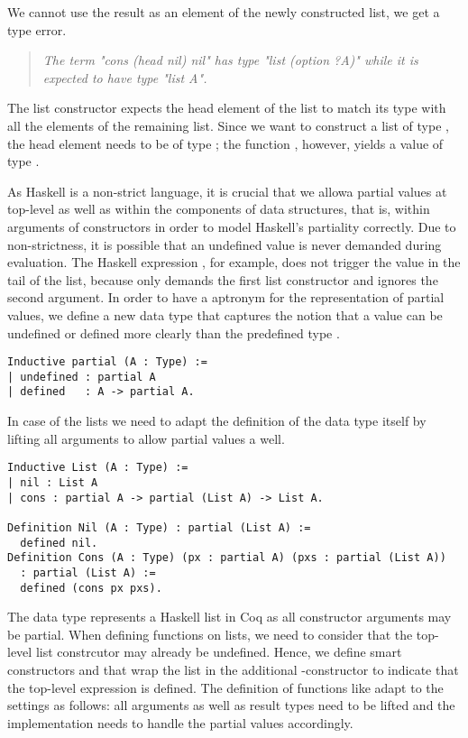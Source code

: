 We cannot use the result as an element of the newly constructed list, we get a type error.

\begin{quote}
\emph{The term "cons (head nil) nil" has type "list (option ?A)" while it is expected to have type "list A".}
\end{quote}

The list constructor  expects the head element of the list to match its type with all the elements of the remaining list.
Since we want to construct a list of type , the head element needs to be of type ; the function , however, yields a value of type .

As Haskell is a non-strict language, it is crucial that we allowa partial values at top-level as well as within the components of data structures, that is, within arguments of constructors in order to model Haskell's partiality correctly.
Due to non-strictness, it is possible that an undefined value is never demanded during evaluation.
The Haskell expression , for example, does not trigger the  value in the tail of the list, because  only demands the first list constructor and ignores the second argument.
In order to have a aptronym for the representation of partial values, we define a new data type  that captures the notion that a value can be undefined or defined more clearly than the predefined type .

\begin{verbatim}
Inductive partial (A : Type) :=
| undefined : partial A
| defined   : A -> partial A.
\end{verbatim}

In case of the lists we need to adapt the definition of the data type itself by lifting all arguments to allow partial values a well.

\begin{verbatim}
Inductive List (A : Type) :=
| nil : List A
| cons : partial A -> partial (List A) -> List A.

Definition Nil (A : Type) : partial (List A) :=
  defined nil.
Definition Cons (A : Type) (px : partial A) (pxs : partial (List A)) 
  : partial (List A) :=
  defined (cons px pxs).
\end{verbatim}

The data type  represents a Haskell list in Coq as all constructor arguments may be partial.
When defining functions on lists, we need to consider that the top-level list constrcutor may already be undefined.
Hence, we define smart constructors  and  that wrap the list in the additional -constructor to indicate that the top-level expression is defined.
The definition of  functions like  adapt to the settings as follows: all arguments as well as result types need to be lifted and the implementation needs to handle the partial values accordingly.

